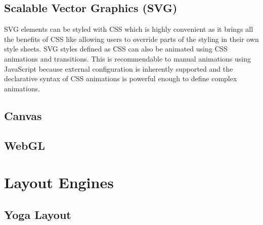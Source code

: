


\subsection{Scalable Vector Graphics (SVG)}







SVG elements can be styled with CSS which is highly convenient as it brings all the benefits of CSS like allowing users to override parts of the styling in their own style sheets. SVG styles defined as CSS can also be animated using CSS animations and transitions. This is recommendable to manual animations using JavaScript because external configuration is inherently supported and the declarative syntax of CSS animations is powerful enough to define complex animations.




\subsection{Canvas}

\subsection{WebGL}

\section{Layout Engines}

\subsection{Yoga Layout}
